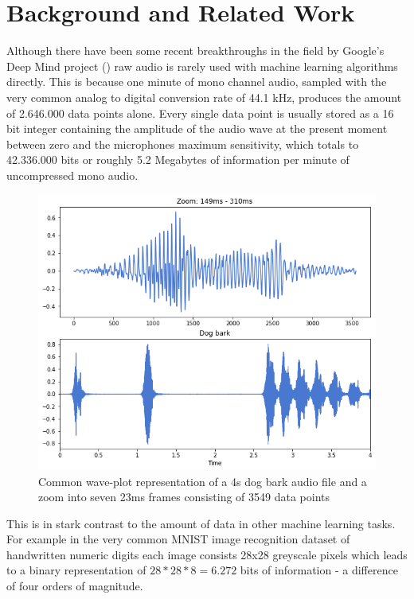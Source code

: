 


\chapter{Background and Related Work}
\label{Background and Related Work}

Although there have been some recent breakthroughs in the field by Google's Deep Mind project (\cite{DBLP:journals/corr/OordDZSVGKSK16}) raw audio is rarely used  with machine learning algorithms directly. This is because one minute of mono channel audio, sampled with the very common analog to digital conversion rate of 44.1 kHz, produces the amount of 2.646.000 data points alone. Every single data point is usually stored as a 16 bit integer containing the amplitude of the audio wave at the present moment between zero and the microphones maximum sensitivity, which totals to 42.336.000 bits or roughly 5.2 Megabytes of information per minute of uncompressed mono audio.


\begin{figure}[h]
    \centering
	\includegraphics[width=.6\textwidth]{./images/illustrations/audio-signal}
    \caption{Common wave-plot representation of a 4s dog bark audio file and a zoom into seven 23ms frames consisting of 3549 data points}
    \label{fig:audio}
\end{figure}


This is in stark contrast to the amount of data in other machine learning tasks. For example in the very common MNIST image recognition dataset of handwritten numeric digits each image consists  28x28 greyscale pixels which leads to a binary representation of $28*28*8 = 6.272$ bits of information \cite{lecun1998mnist} - a difference of four orders of magnitude.  


